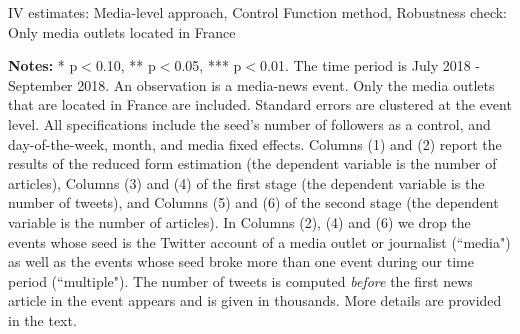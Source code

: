 \clearpage
\pagebreak
\begin{table}
\caption{IV estimates: Media-level approach, Control Function method, Robustness check: Only media outlets located in France}
\begin{center}
	
\end{center}
\begin{spacing}{0.5}
	{\fns \textbf{Notes:} * p$<$0.10, ** p$<$0.05, *** p$<$0.01. The time period is July 2018 - September 2018.  An observation is a media-news event. Only the media outlets that are located in France are included. Standard errors are clustered at the event level. All specifications include the seed's number of followers as a control, and day-of-the-week, month, and media fixed effects. Columns (1) and (2) report the results of the reduced form estimation (the dependent variable is the number of articles), Columns (3) and (4) of the first stage (the dependent variable is the number of tweets), and Columns (5) and (6) of the second stage (the dependent variable is the number of articles). In Columns (2), (4) and (6) we drop the events whose seed is the Twitter account of a media outlet or journalist (``media") as well as the events whose seed broke more than one event during our time period (``multiple"). The number of tweets is computed \textit{before} the first news article in the event appears and is given in thousands. More details are provided in the text.}
\end{spacing}
\label{Tab:regression_media_IV_CF_RFrench}
\end{table} 


